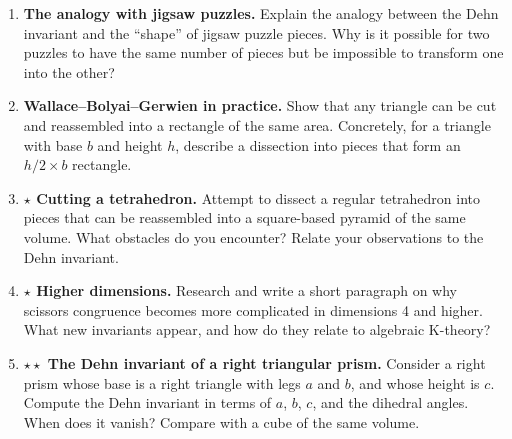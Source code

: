 \begin{enumerate}
    \item \textbf{The analogy with jigsaw puzzles.} Explain the analogy between the Dehn invariant and the ``shape'' of jigsaw puzzle pieces. Why is it possible for two puzzles to have the same number of pieces but be impossible to transform one into the other?

    \item \textbf{Wallace--Bolyai--Gerwien in practice.} Show that any triangle can be cut and reassembled into a rectangle of the same area. Concretely, for a triangle with base $b$ and height $h$, describe a dissection into pieces that form an $h/2 \times b$ rectangle.

    \item \textbf{$\star$ Cutting a tetrahedron.} Attempt to dissect a regular tetrahedron into pieces that can be reassembled into a square-based pyramid of the same volume. What obstacles do you encounter? Relate your observations to the Dehn invariant.

    \item \textbf{$\star$ Higher dimensions.} Research and write a short paragraph on why scissors congruence becomes more complicated in dimensions 4 and higher. What new invariants appear, and how do they relate to algebraic K-theory?

    \item \textbf{$\star\star$ The Dehn invariant of a right triangular prism.} Consider a right prism whose base is a right triangle with legs $a$ and $b$, and whose height is $c$. Compute the Dehn invariant in terms of $a$, $b$, $c$, and the dihedral angles. When does it vanish? Compare with a cube of the same volume.

\end{enumerate}
